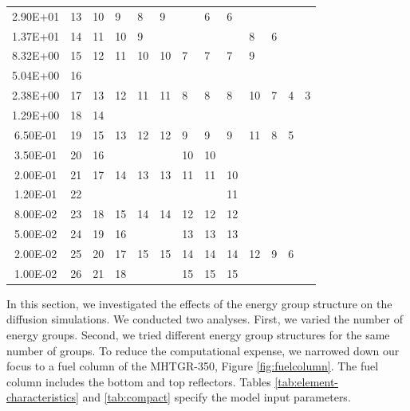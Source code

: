 \documentclass[11pt,letterpaper]{article}
\begin{document}
\begin{table}[htbp!]
\begin{tabular}{c|l|l|l|l|l|l|l|l|l|l|l|l}
  2.90E+01            & 13    & 10   & 9    & 8   & 9   &     & 6   & 6     &     &    &    &   \\ \cline{1-5} \cline{10-11}
  1.37E+01            & 14    & 11   & 10   & 9   &     &     &     &       & 8   & 6  &    &   \\ \cline{1-10}
  8.32E+00            & 15    & 12   & 11   & 10  & 10  & 7   & 7   & 7     & 9   &    &    &   \\ \cline{1-2}
  5.04E+00            & 16    &      &      &     &     &     &     &       &     &    &    &   \\ \hline
  2.38E+00            & 17    & 13   & 12   & 11  & 11  & 8   & 8   & 8     & 10  & 7  & 4  & 3 \\ \cline{1-3}
  1.29E+00            & 18    & 14   &      &     &     &     &     &       &     &    &    &   \\ \cline{1-12} 
  6.50E-01            & 19    & 15   & 13   & 12  & 12  & 9   & 9   & 9     & 11  & 8  & 5  &   \\ \cline{1-3} \cline{7-8}
  3.50E-01            & 20    & 16   &      &     &     & 10  & 10  &       &     &    &    &   \\ \cline{1-9}
  2.00E-01            & 21    & 17   & 14   & 13  & 13  & 11  & 11  & 10    &     &    &    &   \\ \cline{1-2} \cline{9-9}
  1.20E-01            & 22    &      &      &     &     &     &     & 11    &     &    &    &   \\ \cline{1-9} 
  8.00E-02            & 23    & 18   & 15   & 14  & 14  & 12  & 12  & 12    &     &    &    &   \\ \cline{1-4} \cline{7-9}
  5.00E-02            & 24    & 19   & 16   &     &     & 13  & 13  & 13    &     &    &    &   \\ \hline
  2.00E-02            & 25    & 20   & 17   & 15  & 15  & 14  & 14  & 14    & 12  & 9  & 6  &   \\ \cline{1-4} \cline{7-9}
  1.00E-02            & 26    & 21   & 18   &     &     & 15  & 15  & 15    &     &    &    &   \\
  \bottomrule
  \end{tabular}
  \label{tab:energygroups}
\end{table}

In this section, we investigated the effects of the energy group structure on the diffusion simulations.
We conducted two analyses.
First, we varied the number of energy groups.
Second, we tried different energy group structures for the same number of groups.
To reduce the computational expense, we narrowed down our focus to a fuel column of the MHTGR-350, Figure \ref{fig:fuelcolumn}.
The fuel column includes the bottom and top reflectors.
Tables \ref{tab:element-characteristics} and \ref{tab:compact} specify the model input parameters.
\end{document}
